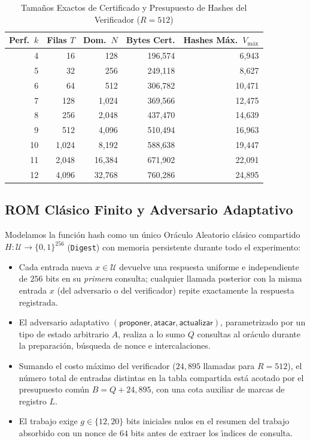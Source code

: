 \documentclass[conference]{IEEEtran}
\theoremstyle{definition}
\begin{document}
\begin{table}[t]
\centering
\caption{Tama\~{n}os Exactos de Certificado y Presupuesto de Hashes del Verificador ($R = 512$)}
\label{tab:profiles}
\scriptsize
\setlength{\tabcolsep}{3pt}
\begin{tabular}{@{}rrrrr@{}}
\toprule
\textbf{Perf.\ $k$} & \textbf{Filas $T$} & \textbf{Dom.\ $N$} & \textbf{Bytes Cert.} & \textbf{Hashes M\'{a}x.\ $V_{\text{m\'{a}x}}$} \\
\midrule
4  & 16   & 128    & 196,574 & 6,943  \\
5  & 32   & 256    & 249,118 & 8,627  \\
6  & 64   & 512    & 306,782 & 10,471 \\
7  & 128  & 1,024  & 369,566 & 12,475 \\
8  & 256  & 2,048  & 437,470 & 14,639 \\
9  & 512  & 4,096  & 510,494 & 16,963 \\
10 & 1,024 & 8,192  & 588,638 & 19,447 \\
11 & 2,048 & 16,384 & 671,902 & 22,091 \\
12 & 4,096 & 32,768 & 760,286 & 24,895 \\
\bottomrule
\end{tabular}
\end{table}

\subsection{ROM Cl\'{a}sico Finito y Adversario Adaptativo}
Modelamos la funci\'{o}n hash como un \'{u}nico Or\'{a}culo Aleatorio cl\'{a}sico compartido $H : \mathcal{U} \to \{0,1\}^{256}$ (\texttt{Digest}) con memoria persistente durante todo el experimento:
\begin{itemize}
    \item Cada entrada nueva $x \in \mathcal{U}$ devuelve una respuesta uniforme e independiente de $256$ bits en su \emph{primera} consulta; cualquier llamada posterior con la misma entrada $x$ (del adversario o del verificador) repite exactamente la respuesta registrada.
    \item El adversario adaptativo $(\mathsf{proponer}, \mathsf{atacar}, \mathsf{actualizar})$, parametrizado por un tipo de estado arbitrario $A$, realiza a lo sumo $Q$ consultas al or\'{a}culo durante la preparaci\'{o}n, b\'{u}squeda de nonce e intercalaciones.
    \item Sumando el costo m\'{a}ximo del verificador ($24{,}895$ llamadas para $R = 512$), el n\'{u}mero total de entradas distintas en la tabla compartida est\'{a} acotado por el presupuesto com\'{u}n $B = Q + 24{,}895$, con una cota auxiliar de marcas de registro $L$.
    \item El trabajo exige $g \in \{12, 20\}$ bits iniciales nulos en el resumen del trabajo absorbido con un nonce de $64$ bits antes de extraer los \'{\i}ndices de consulta.
\end{itemize}
\end{document}
